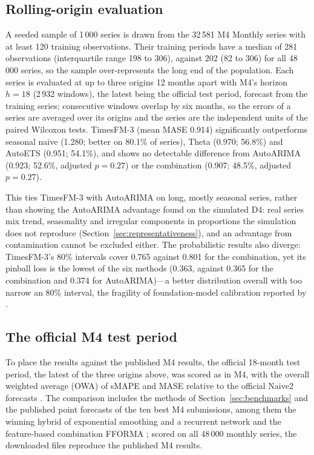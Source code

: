 \documentclass[ASNA]{USG}
\providecommand{\sectionref}[1]{Section~\ref{#1}}
\begin{document}
\subsection{Rolling-origin evaluation}
\label{sec:m4results}

A seeded sample of 1\,000 series is drawn from the 32\,581 M4 Monthly series with at least 120 training
observations. Their training periods have a median of
281 observations (interquartile range 198 to 306), against 202 (82 to 306) for all 48\,000 series, so the
sample over-represents the long end of the population. Each series is evaluated at up to three origins 12 months apart with M4's horizon $h = 18$ (2\,932
windows), the latest being the official test period, forecast from the training series; consecutive windows overlap by six months, so the
errors of a series are averaged over its origins and the series are the independent units of the paired
Wilcoxon tests. TimesFM-3 (mean MASE 0.914) significantly outperforms seasonal naive (1.280; better on 80.1\%
of series), Theta (0.970; 56.8\%) and AutoETS (0.951; 54.1\%), and shows no detectable difference from
AutoARIMA (0.923; 52.6\%, adjusted $p = 0.27$) or the combination (0.907; 48.5\%, adjusted $p = 0.27$).

This ties TimesFM-3 with AutoARIMA on long, mostly seasonal series, rather than showing the AutoARIMA
advantage found on the simulated D4: real series mix trend, seasonality and irregular components in
proportions the simulation does not reproduce (\sectionref{sec:representativeness}), and an advantage from
contamination cannot be excluded either. The probabilistic results also diverge: TimesFM-3's 80\% intervals
cover 0.765 against 0.801 for the combination, yet its pinball loss is the lowest of the six methods (0.363,
against 0.365 for the combination and 0.374 for AutoARIMA)---a better distribution overall with too narrow an
80\% interval, the fragility of foundation-model calibration reported by \citet{adler2026calibrated}.

\subsection{The official M4 test period}
\label{sec:m4official}

To place the results against the published M4 results, the official 18-month test period, the latest of
the three origins above, was scored as in M4, with the overall weighted average (OWA) of sMAPE and MASE relative to the official Naive2 forecasts
\citep{makridakis2020m4}. The comparison includes the methods of \sectionref{sec:benchmarks} and the
published point forecasts of the ten best M4 submissions, among them the winning hybrid of exponential
smoothing and a recurrent network \citep{smyl2020hybrid} and the feature-based combination FFORMA
\citep{monteromanso2020fforma}; scored on all 48\,000 monthly series, the downloaded files reproduce the
published M4 results.
\end{document}
